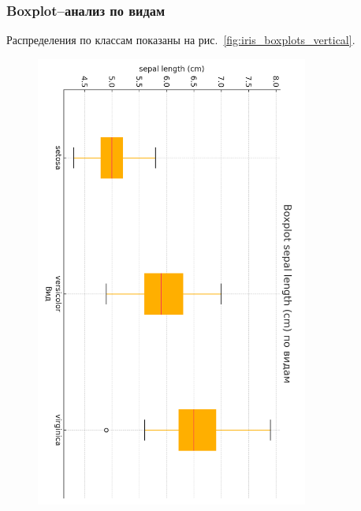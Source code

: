 \subsubsection{Boxplot–анализ по видам}

Распределения по классам показаны на рис.~\ref{fig:iris_boxplots_vertical}.
\begin{figure}[H]
  \centering
  \includegraphics[width=0.8\textwidth]{images/box_sepal_length_cm_cb2.png}\\[6pt]

\end{figure}
